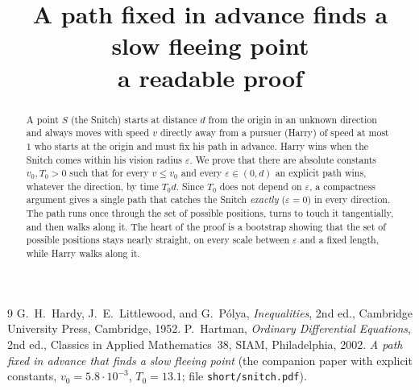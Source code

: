 \documentclass[11pt,letterpaper]{article}
\title{\textbf{A path fixed in advance finds a slow fleeing point}\\[4pt]
\large a readable proof}
\author{}
\date{}
\begin{document}
\maketitle

\begin{abstract}
A point $S$ (the Snitch) starts at distance $d$ from the origin in an unknown direction and always moves with speed $v$
directly away from a pursuer (Harry) of speed at most $1$ who starts at the origin and must fix his path in advance. Harry
wins when the Snitch comes within his vision radius $\varepsilon$. We prove that there are absolute constants $v_0,T_0>0$
such that for every $v\le v_0$ and every $\varepsilon\in(0,d)$ an explicit path wins, whatever the direction, by time
$T_0d$. Since $T_0$ does not depend on $\varepsilon$, a compactness argument gives a single path that catches the Snitch
\emph{exactly} ($\varepsilon=0$) in every direction. The path runs once through the set of possible positions, turns to
touch it tangentially, and then walks along it. The heart of the proof is a bootstrap showing that the set of possible
positions stays nearly straight, on every scale between $\varepsilon$ and a fixed length, while Harry walks along it.
\end{abstract}


\begin{thebibliography}{9}
G.~H.~Hardy, J.~E.~Littlewood, and G.~P\'olya,
\emph{Inequalities}, 2nd ed., Cambridge University Press, Cambridge, 1952.
P.~Hartman,
\emph{Ordinary Differential Equations}, 2nd ed., Classics in Applied Mathematics~38, SIAM, Philadelphia, 2002.
\emph{A path fixed in advance that finds a slow fleeing point} (the companion paper with explicit constants,
$v_0=5.8\cdot10^{-3}$, $T_0=13.1$; file \texttt{short/snitch.pdf}).
\end{thebibliography}

\appendix
{}
\end{document}

